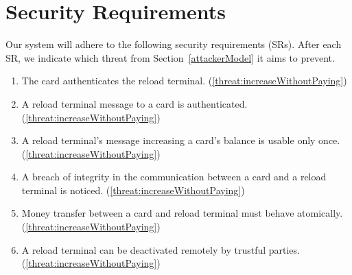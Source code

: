 \section{Security Requirements}
Our system will adhere to the following security requirements (SRs). After each SR, we indicate which threat from Section~\ref{attackerModel} it aims to prevent.
\begin{enumerate}[label={SR\arabic*:}, leftmargin=3\parindent]

    \item \label{sr:cardAuthReload}
    The card authenticates the reload terminal. (\ref{threat:increaseWithoutPaying})
    \item \label{sr:reloadCardMessageAuth}
    A reload terminal message to a card is authenticated. (\ref{threat:increaseWithoutPaying})
    \item \label{sr:noReplayLoadingCard}
    A reload terminal's message increasing a card's balance is usable only once. (\ref{threat:increaseWithoutPaying})
    \item \label{sr:cardReloadMessageIntegrity}
    A breach of integrity in the communication between a card and a reload terminal is noticed. (\ref{threat:increaseWithoutPaying})
    \item \label{sr:cardReloadtransterAtomic}
    Money transfer between a card and reload terminal must behave atomically. (\ref{threat:increaseWithoutPaying})
    \item \label{sr:disableReload}
    A reload terminal can be deactivated remotely by trustful parties. (\ref{threat:increaseWithoutPaying})


\end{enumerate}
